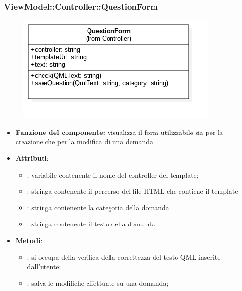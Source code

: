 \subsubsection{ViewModel::Controller::QuestionForm}
 \begin{figure}[h!]
\begin{center}
	\includegraphics[scale=0.4]{../images/ViewModel/Controller/QuestionForm.png}
\end{center}
\end{figure}
 \begin{itemize}
 \item\textbf{Funzione del componente:} visualizza il form utilizzabile sia per la creazione che per la modifica di una domanda
 \item\textbf{Attributi}:
 	\begin{itemize}
 		\item{}: variabile contenente il nome del controller del template;\\
		
		\item{}: stringa contenente il percorso del file HTML che contiene il template\\
		\item{}: stringa contenente la categoria della domanda
		\item{}: stringa contenente il testo della domanda
 	\end{itemize}
 	\item\textbf{Metodi}:
 	\begin{itemize}
 		\item{}: si occupa della verifica della correttezza del testo QML inserito dall'utente;\\
 		\item{}: salva le modifiche effettuate su una domanda;\\
 	\end{itemize}
 \end{itemize}
\newpage
 
